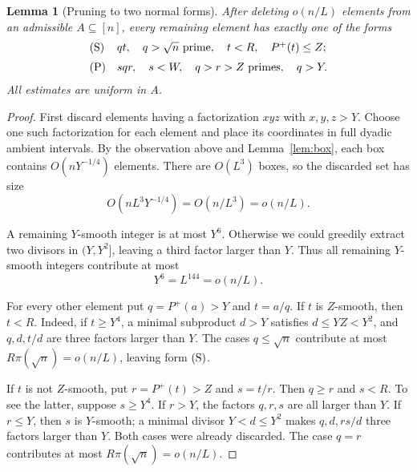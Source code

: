 \documentclass[11pt,reqno]{article}
\newtheorem{lemma}[theorem]{Lemma}
\theoremstyle{definition}
\begin{document}
\begin{lemma}[Pruning to two normal forms]\label{lem:pruning}
After deleting \(o(n/L)\) elements from an admissible \(A\subseteq[n]\),
every remaining element has exactly one of the forms
\[
\begin{array}{ll}
{\rm (S)}& qt,\quad q>\sqrt n\text{ prime},\quad
                 t<R,\quad P^+(t)\leq Z;\\[2mm]
{\rm (P)}& sqr,\quad s<W,\quad q>r>Z\text{ primes},\quad q>Y.
\end{array}
\]
All estimates are uniform in \(A\).
\end{lemma}

\begin{proof}
First discard elements having a factorization \(xyz\) with
\(x,y,z>Y\).  Choose one such factorization for each element and place its
coordinates in full dyadic ambient intervals.  By the observation above and
Lemma~\ref{lem:box}, each box contains \(O(nY^{-1/4})\) elements.  There are
\(O(L^3)\) boxes, so the discarded set has size
\[
  O(nL^3Y^{-1/4})=O(n/L^3)=o(n/L).
\]

A remaining \(Y\)-smooth integer is at most \(Y^6\).  Otherwise we could
greedily extract two divisors in \((Y,Y^2]\), leaving a third factor larger
than \(Y\).  Thus all remaining \(Y\)-smooth integers contribute at most
\[
  Y^6=L^{144}=o(n/L).
\]

For every other element put \(q=P^+(a)>Y\) and \(t=a/q\).  If \(t\) is
\(Z\)-smooth, then \(t<R\).  Indeed, if \(t\geq Y^4\), a minimal subproduct
\(d>Y\) satisfies \(d\leq YZ<Y^2\), and \(q,d,t/d\) are three factors
larger than \(Y\).  The cases \(q\leq\sqrt n\) contribute at most
\(R\pi(\sqrt n)=o(n/L)\), leaving form \({\rm (S)}\).

If \(t\) is not \(Z\)-smooth, put \(r=P^+(t)>Z\) and \(s=t/r\).  Then
\(q\geq r\) and \(s<R\).  To see the latter, suppose \(s\geq Y^4\).
If \(r>Y\), the factors \(q,r,s\) are all larger than \(Y\).  If
\(r\leq Y\), then \(s\) is \(Y\)-smooth; a minimal divisor
\(Y<d\leq Y^2\) makes \(q,d,rs/d\) three factors larger than \(Y\).
Both cases were already discarded.  The case \(q=r\) contributes at most
\(R\pi(\sqrt n)=o(n/L)\).


\end{proof}
\end{document}
